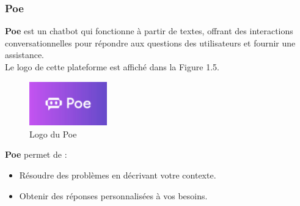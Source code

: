 \subsubsection{Poe}
    \textbf{Poe} est un chatbot qui fonctionne à partir de textes, offrant des interactions conversationnelles pour répondre aux questions des utilisateurs et fournir une assistance.\\
    Le logo de cette plateforme est affiché dans la Figure 1.5.
    \begin{figure}[H]
        \centering
        \includegraphics[width=0.3\textwidth,height=0.2\textwidth]{images/poe-logo.png}
        \caption{Logo du Poe \cite{poe}}
        \label{fig:poe-logo}
    \end{figure}
    \noindent \textbf{Poe} permet de :
        \begin{itemize}[itemsep=1pt, parsep=1pt]
            \item Résoudre des problèmes en décrivant votre contexte.
            \item Obtenir des réponses personnalisées à vos besoins.
        \end{itemize}

